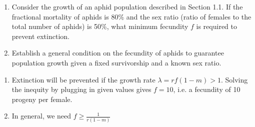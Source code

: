 \begin{homeworkProblem}
    \begin{enumerate}
        \item Consider the growth of an aphid population described in Section 1.1.
        If the fractional mortality of aphids is 80\% and the sex ratio (ratio of
        females to the total number of aphids) is 50\%, what minimum fecundity $f$
        is required to prevent extinction.
        \item Establish a general condition on the fecundity of aphids to guarantee
        population growth given a fixed survivorship and a known sex ratio.
    \end{enumerate}
    
    \segline
    
    \solution
    
    \begin{enumerate}
        \item Extinction will be prevented if the growth rate $\lambda = rf(1-m)>1$.
        Solving the inequity by plugging in given values gives $f = 10$, i.e. a
        fecundity of 10 progeny per female.
        \item In general, we need $f \geq \frac{1}{r(1-m)}$
    \end{enumerate}
    
    \end{homeworkProblem}
